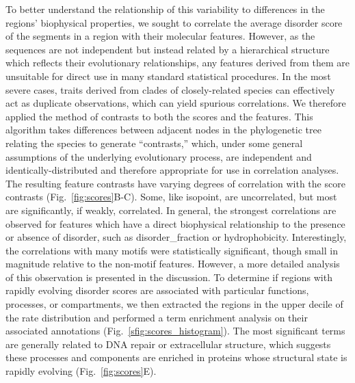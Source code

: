 To better understand the relationship of this variability to differences in the regions' biophysical properties, we sought to correlate the average disorder score of the segments in a region with their molecular features. However, as the sequences are not independent but instead related by a hierarchical structure which reflects their evolutionary relationships, any features derived from them are unsuitable for direct use in many standard statistical procedures. In the most severe cases, traits derived from clades of closely-related species can effectively act as duplicate observations, which can yield spurious correlations. We therefore applied the method of contrasts to both the scores and the features. This algorithm takes differences between adjacent nodes in the phylogenetic tree relating the species to generate ``contrasts,'' which, under some general assumptions of the underlying evolutionary process, are independent and identically-distributed and therefore appropriate for use in correlation analyses. The resulting feature contrasts have varying degrees of correlation with the score contrasts (Fig.~\ref{fig:scores}B-C). Some, like isopoint, are uncorrelated, but most are significantly, if weakly, correlated. In general, the strongest correlations are observed for features which have a direct biophysical relationship to the presence or absence of disorder, such as disorder\_fraction or hydrophobicity. Interestingly, the correlations with many motifs were statistically significant, though small in magnitude relative to the non-motif features. However, a more detailed analysis of this observation is presented in the discussion. To determine if regions with rapidly evolving disorder scores are associated with particular functions, processes, or compartments, we then extracted the regions in the upper decile of the rate distribution and performed a term enrichment analysis on their associated annotations (Fig.~\ref{sfig:scores_histogram}). The most significant terms are generally related to DNA repair or extracellular structure, which suggests these processes and components are enriched in proteins whose structural state is rapidly evolving (Fig.~\ref{fig:scores}E).


